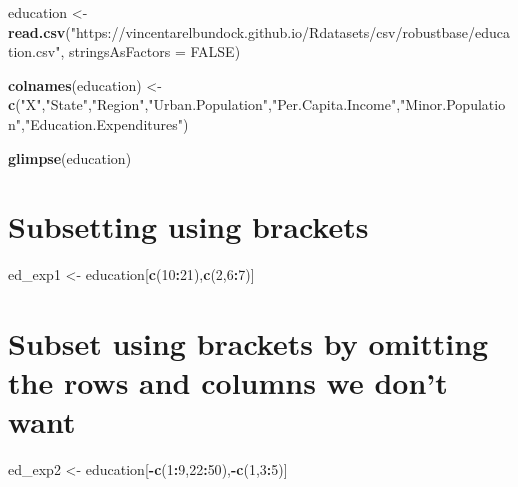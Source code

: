 \documentclass[]{book}
\newenvironment{Shaded}{\begin{snugshade}}{\end{snugshade}}
\newcommand{\DataTypeTok}[1]{\textcolor[rgb]{0.13,0.29,0.53}{#1}}
\newcommand{\DecValTok}[1]{\textcolor[rgb]{0.00,0.00,0.81}{#1}}
\newcommand{\KeywordTok}[1]{\textcolor[rgb]{0.13,0.29,0.53}{\textbf{#1}}}
\newcommand{\NormalTok}[1]{#1}
\newcommand{\OperatorTok}[1]{\textcolor[rgb]{0.81,0.36,0.00}{\textbf{#1}}}
\newcommand{\OtherTok}[1]{\textcolor[rgb]{0.56,0.35,0.01}{#1}}
\newcommand{\StringTok}[1]{\textcolor[rgb]{0.31,0.60,0.02}{#1}}
\begin{document}
\begin{Shaded}
\begin{Highlighting}[]
\NormalTok{education <-}\StringTok{ }\KeywordTok{read.csv}\NormalTok{(}\StringTok{"https://vincentarelbundock.github.io/Rdatasets/csv/robustbase/education.csv"}\NormalTok{, }\DataTypeTok{stringsAsFactors =} \OtherTok{FALSE}\NormalTok{)}

\KeywordTok{colnames}\NormalTok{(education) <-}\StringTok{ }\KeywordTok{c}\NormalTok{(}\StringTok{"X"}\NormalTok{,}\StringTok{"State"}\NormalTok{,}\StringTok{"Region"}\NormalTok{,}\StringTok{"Urban.Population"}\NormalTok{,}\StringTok{"Per.Capita.Income"}\NormalTok{,}\StringTok{"Minor.Population"}\NormalTok{,}\StringTok{"Education.Expenditures"}\NormalTok{)}

\KeywordTok{glimpse}\NormalTok{(education)}
\end{Highlighting}
\end{Shaded}

\hypertarget{subsetting-using-brackets}{%
\section{Subsetting using brackets}\label{subsetting-using-brackets}}

\begin{Shaded}
\begin{Highlighting}[]
\NormalTok{ed_exp1 <-}\StringTok{ }\NormalTok{education[}\KeywordTok{c}\NormalTok{(}\DecValTok{10}\OperatorTok{:}\DecValTok{21}\NormalTok{),}\KeywordTok{c}\NormalTok{(}\DecValTok{2}\NormalTok{,}\DecValTok{6}\OperatorTok{:}\DecValTok{7}\NormalTok{)]}
\end{Highlighting}
\end{Shaded}

\hypertarget{subset-using-brackets-by-omitting-the-rows-and-columns-we-dont-want}{%
\section{Subset using brackets by omitting the rows and columns we don't want}\label{subset-using-brackets-by-omitting-the-rows-and-columns-we-dont-want}}

\begin{Shaded}
\begin{Highlighting}[]
\NormalTok{ed_exp2 <-}\StringTok{ }\NormalTok{education[}\OperatorTok{-}\KeywordTok{c}\NormalTok{(}\DecValTok{1}\OperatorTok{:}\DecValTok{9}\NormalTok{,}\DecValTok{22}\OperatorTok{:}\DecValTok{50}\NormalTok{),}\OperatorTok{-}\KeywordTok{c}\NormalTok{(}\DecValTok{1}\NormalTok{,}\DecValTok{3}\OperatorTok{:}\DecValTok{5}\NormalTok{)]}
\end{Highlighting}
\end{Shaded}
\end{document}
